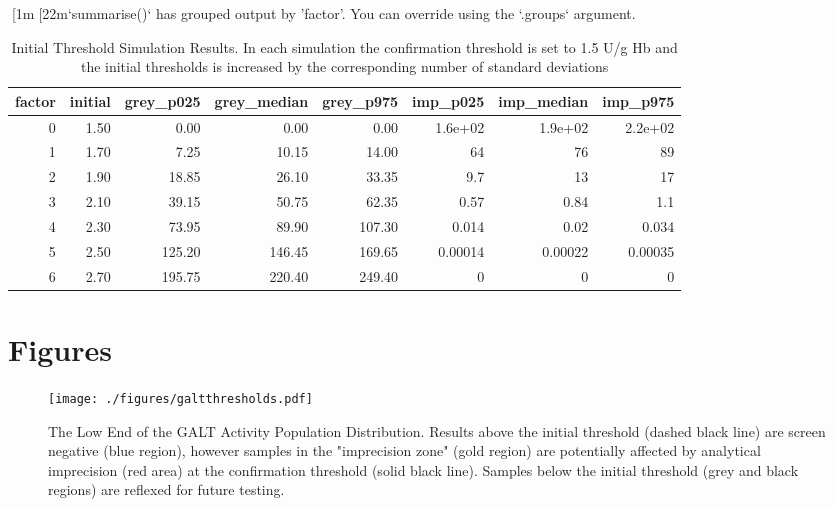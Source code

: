 \documentclass[review]{elsarticle}
\begin{document}
[1m[22m`summarise()` has grouped output by 'factor'. You can override using the `.groups` argument.
\begin{table}[ht]
\centering
\begin{tabular}{rrrrrrrr}
  \hline
factor & initial & grey\_p025 & grey\_median & grey\_p975 & imp\_p025 & imp\_median & imp\_p975 \\ 
  \hline
  0 & 1.50 & 0.00 & 0.00 & 0.00 & 1.6e+02 & 1.9e+02 & 2.2e+02 \\ 
    1 & 1.70 & 7.25 & 10.15 & 14.00 &  64 &  76 &  89 \\ 
    2 & 1.90 & 18.85 & 26.10 & 33.35 & 9.7 &  13 &  17 \\ 
    3 & 2.10 & 39.15 & 50.75 & 62.35 & 0.57 & 0.84 & 1.1 \\ 
    4 & 2.30 & 73.95 & 89.90 & 107.30 & 0.014 & 0.02 & 0.034 \\ 
    5 & 2.50 & 125.20 & 146.45 & 169.65 & 0.00014 & 0.00022 & 0.00035 \\ 
    6 & 2.70 & 195.75 & 220.40 & 249.40 &   0 &   0 &   0 \\ 
   \hline
\end{tabular}
\caption{Initial Threshold Simulation Results. In each simulation the confirmation threshold is set to 1.5 U/g Hb and the initial thresholds is increased by the corresponding number of standard deviations} 
\label{tab:imprecision}
\end{table}

\clearpage

\section*{Figures}
\label{sec:org53364d6}

\begin{figure}[htbp]
\centering
\texttt{[image: ./figures/galtthresholds.pdf]}
\caption{\label{fig:org65e4d0c}The Low End of the GALT Activity Population Distribution. Results above the initial threshold (dashed black line) are screen negative (blue region), however samples in the "imprecision zone" (gold region) are potentially affected by analytical imprecision (red area) at the confirmation threshold (solid black line). Samples below the initial threshold (grey and black regions) are reflexed for future testing.}
\end{figure}

\clearpage
\end{document}
